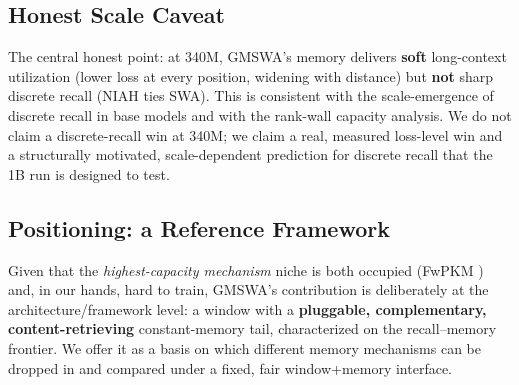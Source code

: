 \documentclass[letterpaper]{article} %
\begin{document}
\subsection{Honest Scale Caveat}
The central honest point: at 340M, GMSWA's memory delivers \textbf{soft} long-context utilization (lower loss at every position, widening with distance) but \textbf{not} sharp discrete recall (NIAH ties SWA). This is consistent with the scale-emergence of discrete recall in base models and with the rank-wall capacity analysis. We do not claim a discrete-recall win at 340M; we claim a real, measured loss-level win and a structurally motivated, scale-dependent prediction for discrete recall that the 1B run is designed to test.

\subsection{Positioning: a Reference Framework}
Given that the \emph{highest-capacity mechanism} niche is both occupied (FwPKM \citep{fwpkm2026}) and, in our hands, hard to train, GMSWA's contribution is deliberately at the architecture/framework level: a window with a \textbf{pluggable, complementary, content-retrieving} constant-memory tail, characterized on the recall--memory frontier. We offer it as a basis on which different memory mechanisms can be dropped in and compared under a fixed, fair window+memory interface.

\end{document}
